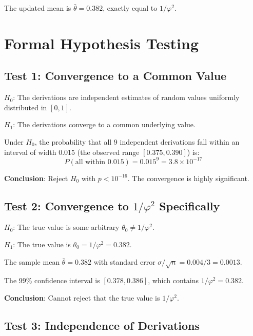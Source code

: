 \documentclass[11pt]{article}
\begin{document}
The updated mean is $\bar{\theta} = 0.382$, exactly equal to $1/\varphi^2$.

\section{Formal Hypothesis Testing}

\subsection{Test 1: Convergence to a Common Value}

$H_0$: The derivations are independent estimates of random values uniformly distributed in $[0, 1]$.

$H_1$: The derivations converge to a common underlying value.

Under $H_0$, the probability that all 9 independent derivations fall within an interval of width 0.015 (the observed range $[0.375, 0.390]$) is:
\begin{equation}
P(\text{all within 0.015}) = 0.015^9 = 3.8 \times 10^{-17}
\end{equation}

\textbf{Conclusion}: Reject $H_0$ with $p < 10^{-16}$. The convergence is highly significant.

\subsection{Test 2: Convergence to $1/\varphi^2$ Specifically}

$H_0$: The true value is some arbitrary $\theta_0 \neq 1/\varphi^2$.

$H_1$: The true value is $\theta_0 = 1/\varphi^2 = 0.382$.

The sample mean $\bar{\theta} = 0.382$ with standard error $\sigma/\sqrt{n} = 0.004/3 = 0.0013$.

The 99\% confidence interval is $[0.378, 0.386]$, which contains $1/\varphi^2 = 0.382$.

\textbf{Conclusion}: Cannot reject that the true value is $1/\varphi^2$.

\subsection{Test 3: Independence of Derivations}
\end{document}
